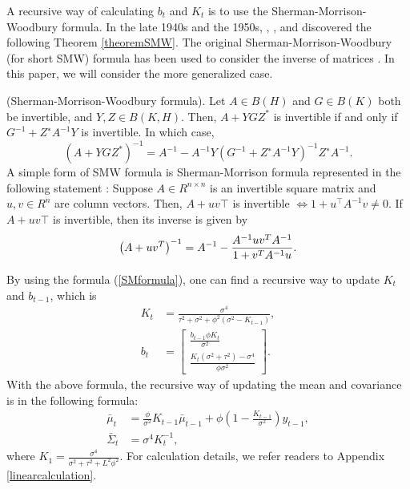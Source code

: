 A recursive way of calculating $b_t$ and $K_t$ is to use the Sherman-Morrison-Woodbury formula. In the late 1940s and the 1950s,
\cite{sherman1950adjustment}, \cite{woodbury1950inverting}, \cite{bartlett1951inverse} and \cite{bodewig1956matrix} 
discovered the following Theorem \ref{theoremSMW}. The original Sherman-Morrison-Woodbury (for short SMW) formula has been used to consider the inverse of matrices \cite{deng2011generalization}. In this paper, we will consider the more generalized case. 
\begin{theorem}\label{theoremSMW}
(Sherman-Morrison-Woodbury formula). Let $A \in B(H)$ and $G \in B(K)$ both be invertible, and $Y, Z \in B(K, H)$. Then, $A + YGZ^*$ is invertible if and only if $G^{-1} + Z^∗A^{-1}Y$ is invertible. In which case,
\begin{equation}\label{SMWformula}
\left(A+YGZ^*\right)^{-1}= A^{-1}-A^{-1}Y\left(G^{-1}+Z^∗A^{-1}Y\right)^{-1}Z^∗A^{-1}.
\end{equation}
A simple form of SMW formula is Sherman-Morrison formula represented in the following statement \cite{bartlett1951inverse}:
Suppose $A\in R^{n\times n}$ is an invertible square matrix and $u,v\in R^n$ are column vectors. Then, $A+uv\top$ is invertible $\iff 1+u^\top A^{-1}v\neq 0$. If $A+uv\top$ is invertible, then its inverse is given by
\begin{equation}\label{SMformula}
\left(A+uv^{T}\right)^{-1}=A^{-1}-{A^{-1}uv^{T}A^{-1} \over 1+v^{T}A^{-1}u}.
\end{equation}
\end{theorem}


By using the formula (\ref{SMformula}), one can find a recursive way to update $K_{t}$ and $b_{t-1}$, which is 
\begin{align}
K_{t}  &=\frac{\sigma^4}{\tau^2+\sigma^2+\phi^2(\sigma^2-K_{t-1})},\\
b_{t} &= \begin{bmatrix}
\frac{b_{t-1}\phi K_{t}}{\sigma^2} \\ \frac{K_{t}(\sigma^2+\tau^2)-\sigma^4 }{\phi\sigma^2}
\end{bmatrix}. 
\end{align}
With the above formula, the recursive way of updating the mean and covariance is in the following formula: 
\begin{align}
\bar{\mu}_{t}       & = \frac{\phi}{\sigma^2}K_{t-1}\bar{\mu}_{t-1} + \phi \left(1 - \frac{K_{t-1}}{\sigma^2}\right)y_{t-1}, \\
\bar{\Sigma}_{t}  &= \sigma^4K_{t}^{-1},
\end{align}
where $K_1=\frac{\sigma^4}{\sigma^2+\tau^2+L^2\phi^2}$. For calculation details, we refer readers to Appendix \ref{linearcalculation}.


